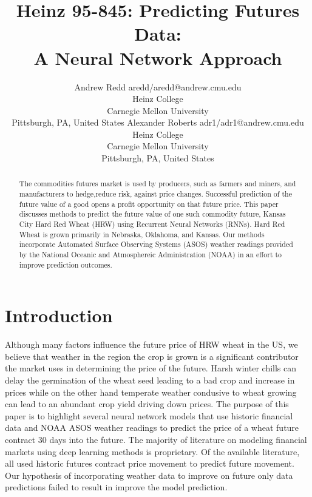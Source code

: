 \documentclass[twoside,11pt]{article}
\begin{document}
\title{Heinz 95-845: Predicting Futures Data:\\ A Neural Network Approach}

\author{\name Andrew Redd \email aredd/aredd@andrew.cmu.edu \\
       \addr Heinz College\\
       Carnegie Mellon University\\
       Pittsburgh, PA, United States
       \AND
       \name Alexander Roberts \email adr1/adr1@andrew.cmu.edu \\
       \addr Heinz College\\
       Carnegie Mellon University\\
       Pittsburgh, PA, United States}


\maketitle

\begin{abstract}
  The commodities futures market is used by producers, such as farmers and miners, and manufacturers to hedge,reduce risk, against price changes. Successful prediction of the future value of a good opens a profit opportunity on that future price. This paper discusses methods to predict the future value of one such commodity future, Kansas City Hard Red Wheat (HRW) using Recurrent Neural Networks (RNNs). Hard Red Wheat is grown primarily in Nebraska, Oklahoma, and Kansas. Our methods incorporate Automated Surface Observing Systems (ASOS) weather readings provided by the National Oceanic and Atmosphereic Administration (NOAA) in an effort to improve prediction outcomes.
\end{abstract}

\section{Introduction}

Although many factors influence the future price of HRW wheat in the US, we believe that weather in the region the crop is grown is a significant contributor the market uses in determining the price of the future.  Harsh winter chills can delay the germination of the wheat seed leading to a bad crop and increase in prices while on the other hand temperate weather condusive to wheat growing can lead to an abundant crop yield driving down prices.  The purpose of this paper is to highlight several neural network models that use historic financial data and NOAA ASOS weather readings to predict the price of a wheat future contract 30 days into the future. The majority of literature on modeling financial markets using deep learning methods is proprietary. Of the available literature, all used historic futures contract price movement to predict future movement. Our hypothesis of incorporating weather data to improve on future only data predictions failed to result in improve the model prediction. 
\end{document}

